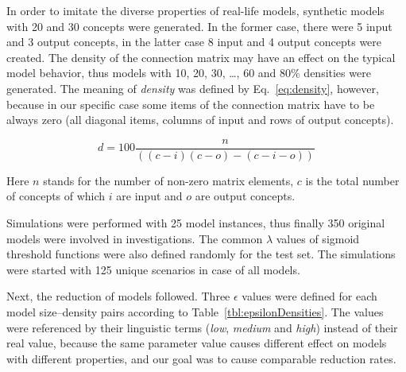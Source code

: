\documentclass[graybox]{svmult}
\begin{document}
In order to imitate the diverse properties of real-life models, 
synthetic models with 20 and 30 concepts were generated. In the former 
case, there were 5 input and 3 output concepts, in the latter case 8 
input and 4 output concepts were created. The density of the connection 
matrix may have an effect on the typical model behavior, thus models 
with 10, 20, 30, \dots, 60 and 80\% densities were generated. The 
meaning of \emph{density} was defined by Eq.~\ref{eq:density}, however, 
because in our specific case some items of the connection matrix have 
to be always zero (all diagonal items, columns of input and rows of 
output concepts).

\begin{equation}
  \label{eq:density}
  d = 100 \frac{n}{\left( (c-i)(c-o) - (c-i-o) \right)}
\end{equation}

Here $n$ stands for the number of non-zero matrix elements, $c$ is the 
total number of concepts of which $i$ are input and $o$ are output concepts.

Simulations were performed with 25 model instances, thus finally 350 
original models were involved in investigations. The common $\lambda$ 
values of sigmoid threshold functions were also defined randomly for 
the test set. The simulations were started with 125 unique scenarios in 
case of all models.

Next, the reduction of models followed. Three $\epsilon$ values were 
defined for each model size--density pairs according to 
Table~\ref{tbl:epsilonDensities}. The values were referenced by their 
linguistic terms (\emph{low}, \emph{medium} and \emph{high}) instead of 
their real value, because the same parameter value causes different 
effect on models with different properties, and our goal was to cause 
comparable reduction rates.
\end{document}
